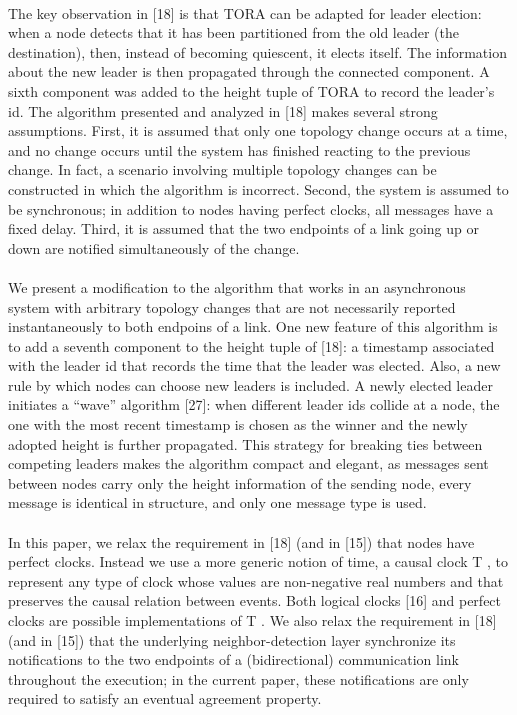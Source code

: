 \paragraph{}The key observation in [18] is that TORA can be adapted for leader election: when a node detects that it has been partitioned from the old leader (the destination), then, instead of becoming quiescent, it elects itself. The information about the new leader is then propagated through the connected component. A sixth component was added to the height tuple of TORA to record the leader’s id. The algorithm presented and analyzed in [18] makes several strong assumptions. First, it is assumed that only one topology change occurs at a time, and no change occurs until the system has finished reacting to the previous change. In fact, a scenario involving multiple topology changes can be constructed in which the algorithm is incorrect. Second, the system is assumed to be synchronous; in addition to nodes having perfect clocks, all messages have a fixed delay. Third, it is assumed that the two endpoints of a link going up or down are notified simultaneously of the change.
\paragraph{}We present a modification to the algorithm that works in an asynchronous system with arbitrary topology changes that are not necessarily reported instantaneously to both endpoins of a link. One new feature of this algorithm is to add a seventh component to the height tuple of [18]: a timestamp associated with the leader id that records the time that the leader was elected. Also, a new rule by which nodes can choose new leaders is included. A newly elected leader initiates a “wave” algorithm [27]: when different leader ids collide at a node, the one with the most recent timestamp is chosen as the winner and the newly adopted height is further propagated. This strategy for breaking ties between competing leaders makes the algorithm compact and elegant, as messages sent between nodes carry only the height information of the sending node, every message is identical in structure, and only one message type is used.
\paragraph{}In this paper, we relax the requirement in [18] (and in [15]) that nodes have perfect clocks. Instead we use a more generic notion of time, a causal clock T , to represent any type of clock whose values are non-negative real numbers and that preserves the causal relation between events. Both logical clocks [16] and perfect clocks are possible implementations of T . We also relax the requirement in [18] (and in [15]) that the underlying neighbor-detection layer synchronize its notifications to the two endpoints of a (bidirectional) communication link throughout the execution; in the current paper, these notifications are only required to satisfy an eventual agreement property.
